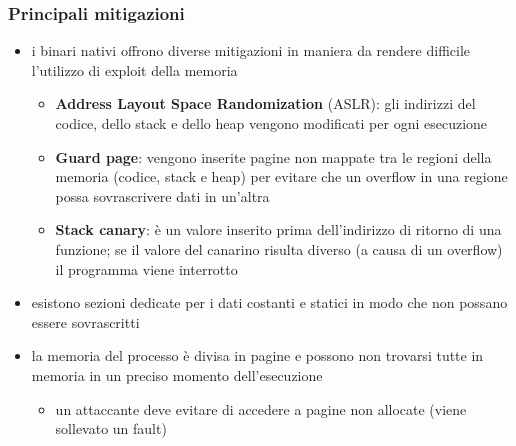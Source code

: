 \documentclass{beamer}
\begin{document}
\begin{frame}
  \frametitle{Principali mitigazioni}
  \begin{itemize}
    \item i binari nativi offrono diverse mitigazioni in maniera da rendere
      difficile l'utilizzo di exploit della memoria
      \begin{itemize}
        \item \textbf{Address Layout Space Randomization} (ASLR): gli indirizzi
          del codice, dello stack e dello heap vengono modificati per ogni
          esecuzione
        \item \textbf{Guard page}: vengono inserite pagine non mappate tra le
          regioni della memoria (codice, stack e heap) per evitare che un
          overflow in una regione possa sovrascrivere dati in un'altra
        \item \textbf{Stack canary}: è un valore inserito prima dell'indirizzo di
          ritorno di una funzione; se il valore del canarino risulta diverso
          (a causa di un overflow) il programma viene interrotto  
      \end{itemize}
    \item esistono sezioni dedicate per i dati costanti e statici in modo che
      non possano essere sovrascritti
    \item la memoria del processo è divisa in pagine e possono non trovarsi tutte
      in memoria in un preciso momento dell'esecuzione
      \begin{itemize}
        \item un attaccante deve evitare di accedere a pagine non allocate
          (viene sollevato un fault)
      \end{itemize}
  \end{itemize}
\end{frame}
\end{document}
